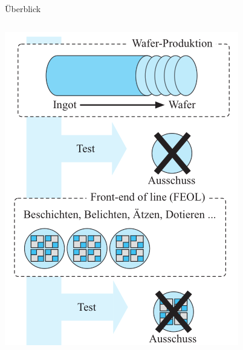 \documentclass[12pt%
,aspectratio=169%
]{beamer}
\begin{document}
\begin{frame}{Überblick}
\begin{columns}[T]
\begin{column}{.38\textwidth}
\includegraphics[scale=0.4]{pictures/ic1}
\end{column}%
\end{columns}
\end{frame}
\end{document}
